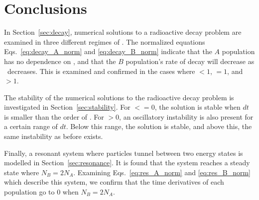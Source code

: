 \documentclass[pra,twocolumn,showpacs,amsmath,amssymb]{revtex4-1}
\begin{document}
\section{Conclusions} \label{sec:conclusion}

In Section~\ref{sec:decay}, numerical solutions to a radioactive decay problem
are examined in three different regimes of \trel. The normalized equations
Eqs.~\ref{eq:decay_A_norm} and \ref{eq:decay_B_norm} indicate that the $A$ population
has no dependence on \trel, and that the $B$ population's rate of decay will
decrease as \trel~decreases. This is examined and confirmed in the cases where \trel$<1$,
\trel$=1$, and \trel$>1$.

The stability of the numerical solutions to the radioactive decay problem is
investigated in Section~\ref{sec:stability}. For \trel$<=0$, the solution is
stable when $dt$ is smaller than the order of \trel. For \trel$>0$, an
oscillatory instability is also present for a certain range of $dt$. Below this
range, the solution is stable, and above this, the same instability as before exists.

Finally, a resonant system where particles tunnel between two energy states
is modelled in Section~\ref{sec:resonance}. It is found that the system reaches
a steady state where $N_B = 2 N_A$. Examining Eqs.~\ref{eq:res_A_norm} and
\ref{eq:res_B_norm} which describe this system, we confirm that the time
derivatives of each population go to 0 when $N_B = 2 N_A$.

\begin{thebibliography}{1}

\end{thebibliography}
\end{document}
